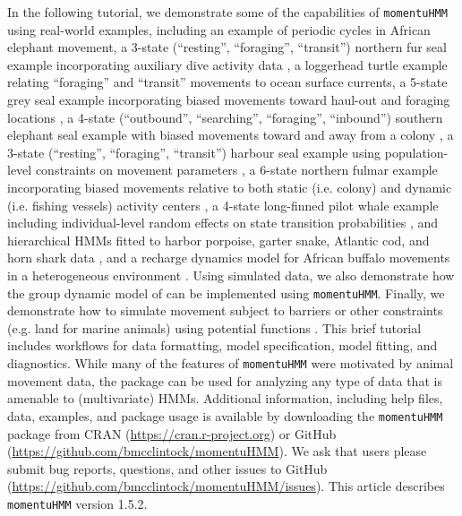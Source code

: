 \documentclass[12pt]{article}\usepackage[]{graphicx}\usepackage[]{color}
\begin{document}
In the following tutorial, we demonstrate some of the capabilities of \verb|momentuHMM| using real-world examples, including an example of periodic cycles in African elephant movement, a 3-state (``resting'', ``foraging'', ``transit'') northern fur seal example incorporating auxiliary dive activity data \citep{McClintockEtAl2014b}, a loggerhead turtle example relating ``foraging'' and ``transit'' movements to ocean surface currents, a 5-state grey seal example incorporating biased movements toward haul-out and foraging locations \citep{McClintockEtAl2012}, a 4-state (``outbound'', ``searching'', ``foraging'', ``inbound'') southern elephant seal example with biased movements toward and away from a colony \citep{MichelotEtAl2017}, a 3-state (``resting'', ``foraging'', ``transit'') harbour seal example using population-level constraints on movement parameters \citep{McClintockEtAl2013c}, a 6-state northern fulmar example incorporating biased movements relative to both static (i.e. colony) and dynamic (i.e. fishing vessels) activity centers \citep{PirottaEtAl2018}, a 4-state long-finned pilot whale example including individual-level random effects on state transition probabilities \citep{IsojunnoEtAl2017}, and hierarchical HMMs fitted to harbor porpoise, garter snake, Atlantic cod, and horn shark data \citep{Leos-BarajasEtAl2017,AdamEtAl2019}, and a recharge dynamics model for African buffalo movements in a heterogeneous environment \citep{HootenEtAl2019}. Using simulated data, we also demonstrate how the group dynamic model of \cite{LangrockEtAl2014} can be implemented using \verb|momentuHMM|. Finally, we demonstrate how to simulate movement subject to barriers or other constraints (e.g. land for marine animals) using potential functions \citep[e.g.][]{BrillingerEtAl2012}. This brief tutorial includes workflows for data formatting, model specification, model fitting, and diagnostics. While many of the features of \verb|momentuHMM| were motivated by animal movement data, the package can be used for analyzing any type of data that is amenable to (multivariate) HMMs.  Additional information, including help files, data, examples, and package usage is available by downloading the \verb|momentuHMM| package from CRAN (\url{https://cran.r-project.org}) or GitHub (\url{https://github.com/bmcclintock/momentuHMM}). We ask that users please submit bug reports, questions, and other issues to GitHub (\url{https://github.com/bmcclintock/momentuHMM/issues}). This article describes \verb|momentuHMM| version 1.5.2.
\end{document}
